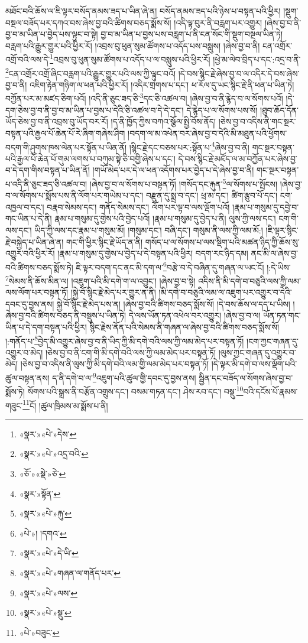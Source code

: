 མཐོང་བའི་ཆོས་ལ་ཇི་ལྟར་བསོད་ནམས་ཟད་པ་ཡིན་ཞེ་ན། བསོད་ནམས་ཟད་པའི་ཉེས་པ་བསྟན་པའི་ཕྱིར། །སྡུག་བསྔལ་བཟོད་པར་དཀའ་བས་ཞེས་བྱ་བའི་ཚིགས་བཅད་སྨོས་སོ། །འདི་ལྟ་བུར་ནི་བརླག་པར་འགྱུར། །ཞེས་བྱ་བ་ནི་བྱ་བ་མ་ཡིན་པ་བྱེད་པས་ལྟུང་བ་སྟེ། བྱ་བ་མ་ཡིན་པ་བྱས་པས་བརླག་པ་ནི་ངན་སོང་གི་སྡུག་བསྔལ་ཡིན་ཏེ། བརླག་པའི་རྒྱུར་གྱུར་པའི་ཕྱིར་རོ། །འབྲས་བུ་ཕུན་སུམ་ཚོགས་པ་འདོད་པས་བསླུས། །ཞེས་བྱ་བ་ནི། ངན་འགྲོར་འགྲོ་བའི་ལས་དེ་\footnote{«སྣར་»«པེ་»དེས་}འབྲས་བུ་ཕུན་སུམ་ཚོགས་པ་འདོད་པ་ལ་བསླུས་པའི་ཕྱིར་རོ། །ཕྱེ་མ་ལེབ་བྲིད་པ་དང་:འདྲ་བ་ནི་\footnote{«སྣར་»«པེ་»འདྲ་བའི་}ངན་འགྲོར་འགྲོ་ཞིང་བརླག་པའི་རྒྱུར་གྱུར་པའི་ལས་ཀྱི་ལྟུང་བའོ། །དེ་བས་སྙིང་རྗེ་ཞེས་བྱ་བ་ལ་འདིར་དེ་བས་ཞེས་བྱ་བ་ནི། འཇིག་རྟེན་གཉིག་ལ་ཕན་པའི་ཕྱིར་རོ། །འདིར་གྲགས་པ་དང་། ཕ་རོལ་དུ་ཡང་སྙིང་རྗེ་ནི་ཕན་པ་ཡིན་ཏེ། བཀྱོན་པར་མ་མཛད་ཅིག་པའོ། །འདི་ནི་ཅུང་ཟད་ཅི་\footnote{«ཅོ་»«སྡེ་»ཅེ་}དང་ཅི་འཚལ་བ། །ཞེས་བྱ་བ་ནི་རྙེད་བ་ལ་སོགས་པའོ། །དེ་དག་ཅེས་བྱ་བ་ནི་བྱ་བ་མ་ཡིན་པ་བྱས་པ་དེའི་ཅི་འཚལ་བ་དེ་དེ་དང་། དེ་རྙེད་པ་ལ་སོགས་པས་སོ། །ཐུབ་ཆོད་དོན་ཡོད་ཅེས་བྱ་བ་ནི་འབྲས་བུ་ཡོད་བར་རོ། །ད་ནི་ཁྱོད་ཀྱིས་བཀའ་སྩོལ་སྤྱི་བོས་ནོད། །ཅེས་བྱ་བ་འདིས་ནི་གང་སྔར་བསྟན་པའི་རྒྱལ་པོ་ཆེན་པོ་རེ་ཞིག་གཞེས་ཤིག །བདག་ལ་མ་འཕེན་བར་ཞེས་བྱ་བ་དེའི་མི་མཐུན་པའི་ཕྱོགས་བདག་གི་ཤུགས་ཁས་ལེན་པར་སྟོན་པ་ཡིན་ནོ། །སྙིང་རྗེ་དང་བཅས་པར་:སྟོན་པ་\footnote{«སྣར་»སྟོན་}ཞེས་བྱ་བ་ནི། གང་སྔར་བསྟན་པའི་རྒྱལ་པོ་ཆེན་པོ་གུམ་ལགས་པ་བཀུམ་སྟེ་ཅི་བགྱི་ཞེས་པ་དང་། དེ་བས་སྙིང་རྗེ་མཛོད་ལ་མ་བཀྱོན་པར་ཞེས་བྱ་བ་དེ་དག་གིས་བསྟན་པ་ཡིན་ནོ། །གཡོ་མེད་པར་དེ་ལ་ཕན་འདོགས་པར་བྱེད་པ་དེ་ཞེས་བྱ་བ་ནི། གང་སྔར་བསྟན་པ་འདི་ནི་ཅུང་ཟད་ཅི་འཚལ་བ། །ཞེས་བྱ་བ་ལ་སོགས་པ་བསྟན་ཏོ། །གསོད་དང་རྐུན་\footnote{«སྣར་»«པེ་»རྐུ་}ལ་སོགས་པ་སྤོངས། །ཞེས་བྱ་བ་ལ་སོགས་པ་སྨོས་པས་ནི་ལོག་པར་གཡེམ་པ་དང་། བརྫུན་དུ་སྨྲ་བ་དང་། ཕྲ་མ་དང་། ཚིག་རྩུབ་པོ་དང་། ངག་འཁྱལ་བ་དང་། བརྣབ་སེམས་དང་། གནོད་སེམས་དང་། ལོག་པར་ལྟ་བ་ལས་ལྡོག་པའོ། །རྣམ་པ་གསུམ་དུ་དབྱེ་བ་གང་ཡིན་པ་དེ་ནི། རྣམ་པ་གསུམ་དུ་གྱེས་པའི་བྱེད་པའོ། །རྣམ་པ་གསུམ་དུ་བྱེད་པ་ནི། ལུས་ཀྱི་ལས་དང་། ངག་གི་ལས་དང་། ཡིད་ཀྱི་ལས་དང་རྣམ་པ་གསུམ་མོ། །གསུམ་དང་། བཞི་དང་། གསུམ་ནི་ལས་ཀྱི་ལམ་མོ:། །ཇི་ལྟར་སྙིང་རྗེ་བསྐྱེད་པ་ཡིན་ཞེ་ན། གང་གི་ཕྱིར་སྙིང་རྗེ་ཡོད་ན་ནི། གསོད་པ་ལ་སོགས་པ་ལས་སྡིག་པའི་མཚན་ཉིད་ཀྱི་ཆོས་སུ་འགྱུར་བའི་ཕྱིར་རོ། །རྣམ་པ་གསུམ་དུ་གྱེས་པ་བྱེད་པ་དེ་བསྟན་པའི་ཕྱིར། བདག་རང་ཉིད་དམ། ནང་མི་ལ་ཞེས་བྱ་བའི་ཚིགས་བཅད་སྨོས་ཏེ། ཇི་ལྟར་བདག་དང་ནང་མི་དག་ལ་\footnote{«པེ་»། །དགའ་}བརྩེ་བ་དེ་བཞིན་དུ་གཞན་ལ་ཡང་ངོ། །:དེ་ཡིས་\footnote{«སྣར་»«པེ་»དེ་ཡི་}སེམས་ནི་ཆོས་མིན་ལ། །འཇུག་པའི་མི་དགེ་ག་ལ་འབྱུང་། །ཞེས་བྱ་བ་སྟེ། འདིས་ནི་མི་དགེ་བ་བཅུའི་ལས་ཀྱི་ལམ་ལས་ལོག་པར་བསྟན་ཏོ། །སྐྱེ་བོ་སྙིང་རྗེ་མེད་པར་གྱུར་ན་ནི། །མི་དགེ་བ་བཅུའི་ལམ་ལ་འཇུག་པར་འགྱུར་བ་དེའི་དབང་དུ་བྱས་ནས། སྐྱེ་བོ་སྙིང་རྗེ་མེད་པས་ན། །ཞེས་བྱ་བའི་ཚིགས་བཅད་སྨོས་སོ། །དེ་བས་ཆོས་ལ་དད་པ་ཡིས། །ཞེས་བྱ་བའི་ཚིགས་བཅད་ནི་བསྡུས་པ་ཡིན་ཏེ། དེ་ལས་ཡོན་ཏན་འཕེལ་བར་འགྱུར། །ཞེས་བྱ་བ་ལ། ཡོན་ཏན་གང་ཡིན་པ་དེ་དག་བསྟན་པའི་ཕྱིར། སྙིང་རྗེས་ནོན་པའི་སེམས་ནི་གཞན་ལ་ཞེས་བྱ་བའི་ཚིགས་བཅད་སྨོས་སོ། །:གནོད་པ་\footnote{«སྣར་»«པེ་»གཞན་ལ་གནོད་པར་}བྱེད་མི་འགྱུར་ཞེས་བྱ་བ་ནི་ཡིད་ཀྱི་མི་དགེ་བའི་ལས་ཀྱི་ལམ་མེད་པར་བསྟན་ཏོ། །ངག་ཀྱང་གཞན་དུ་འགྱུར་བ་མེད། །ཅེས་བྱ་བ་ནི་ངག་གི་མི་དགེ་བའི་ལས་ཀྱི་ལམ་མེད་པར་བསྟན་ཏོ། །ལུས་ཀྱང་གཞན་དུ་འགྱུར་བ་མེད། །ཅེས་བྱ་བ་འདིས་ནི་ལུས་ཀྱི་མི་དགེ་བའི་ལམ་གྱི་ལམ་མེད་པར་བསྟན་ཏོ། །དེ་ལྟར་མི་དགེ་བ་ལས་ལྡོག་པའི་ཚུལ་བསྟན་ནས། ད་ནི་དགེ་བ་ལ་\footnote{«སྣར་»«པེ་»ལས་}འཇུག་པའི་ཚུལ་གྱི་དབང་དུ་བྱས་ནས། སྦྱིན་དང་བཟོད་ལ་སོགས་ཞེས་བྱ་བ་སྨོས་ཏེ། སོགས་པའི་སྒྲས་ནི་བརྩོན་འགྲུས་དང་། བསམ་གཏན་དང་། ཤེས་རབ་དང་། བསྡུ་\footnote{«སྣར་»«པེ་»སྡུ་}བའི་དངོས་པོ་རྣམས་གཟུང་\footnote{«པེ་»བཟུང་}ངོ། །ཚུལ་ཁྲིམས་མ་སྨོས་པ་ནི། 
